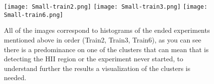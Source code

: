 \documentclass[11pt,fleqn]{book} %
\begin{document}
																																																																																																																																																																																																																																																																																											\begin{figure}[h!]
																																																																																																																																																																																																																																																																																												\centering
																																																																																																																																																																																																																																																																																												    \texttt{[image: Small-train2.png]}
																																																																																																																																																																																																																																																																																												        \texttt{[image: Small-train3.png]}
																																																																																																																																																																																																																																																																																													    \texttt{[image: Small-train6.png]}
																																																																																																																																																																																																																																																																																													        \caption{All of the images correspond to histograms of the ended experiments mentioned above in order (Train2, Train3, Train6), as you can see there is a predominance on one of the clusters that can mean that is detecting the HII region or the experiment never started, to understand further the results a visualization of the clusters is needed.}
																																																																																																																																																																																																																																																																																														    \label{img:smallended}
																																																																																																																																																																																																																																																																																														    \end{figure}
\end{document}
